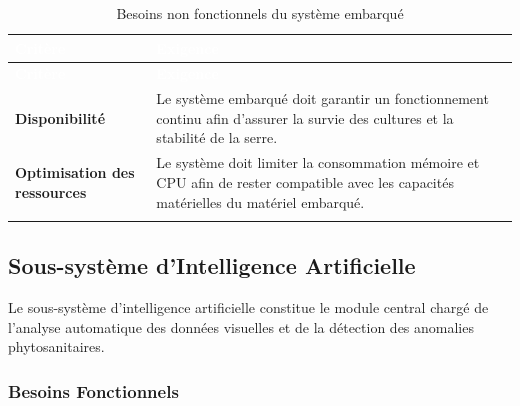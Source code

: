 {\small
	\renewcommand{\arraystretch}{1.5}
	\begin{longtable}{|p{4cm}|p{9cm}|}
		
		\hline
		\rowcolor[HTML]{2C3E50}
		\textcolor{white}{\textbf{Critère}} &
		\textcolor{white}{\textbf{Exigence}}
		\\ \hline
		\endfirsthead
		
		\hline
		\rowcolor[HTML]{2C3E50}
		\textcolor{white}{\textbf{Critère}} &
		\textcolor{white}{\textbf{Exigence}}
		\\ \hline
		\endhead
		
		\rowcolor[HTML]{EFEFEF}
		\textbf{Disponibilité} &
		Le système embarqué doit garantir un fonctionnement continu afin d’assurer la survie des cultures et la stabilité de la serre.
		\\ \hline
		
		\textbf{Optimisation des ressources} &
		Le système doit limiter la consommation mémoire et CPU afin de rester compatible avec les capacités matérielles du matériel embarqué.
		\\ \hline
		
		\caption{Besoins non fonctionnels du système embarqué}
		\label{tab:bnf-embedded}
		
	\end{longtable}
}

\subsection{Sous-système d'Intelligence Artificielle}

Le sous-système d’intelligence artificielle constitue le module central chargé de l’analyse automatique des données visuelles et de la détection des anomalies phytosanitaires.

\subsubsection{Besoins Fonctionnels}

